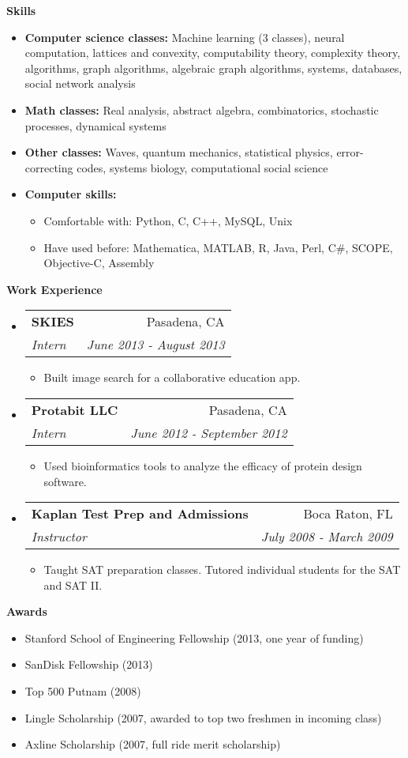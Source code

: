 \documentclass[letterpaper,11pt]{article}
\makeatletter
\newcommand{\resitem}[1]{\item #1 \vspace{-2pt}}
\newcommand{\resheading}[1]{{\large \colorbox{mygrey}{\begin{minipage}{\textwidth}{\textbf{#1 \vphantom{p\^{E}}}}\end{minipage}}}}
\newcommand{\ressubheading}[4]{
\begin{tabular*}{7.0in}{l@{\extracolsep{\fill}}r}
		\textbf{#1} & #2 \\
		\textit{#3} & \textit{#4}\\
\end{tabular*}\vspace{-6pt}}
\makeatother
\begin{document}
\resheading{Skills}
\begin{itemize}
\item \textbf{Computer science classes:} Machine learning (3 classes), neural computation, lattices and convexity, computability theory, complexity theory, algorithms, graph algorithms, algebraic graph algorithms, systems, databases, social network analysis
\item \textbf{Math classes:}  Real analysis, abstract algebra, combinatorics, stochastic processes, dynamical systems
\item \textbf{Other classes:} Waves, quantum mechanics, statistical physics, error-correcting codes, systems biology, computational social science
\item \textbf{Computer skills:}
	\begin{itemize}
	\item Comfortable with: Python, C, C++, MySQL, Unix
	\item Have used before: Mathematica, MATLAB, R, Java, Perl, C\#, SCOPE, Objective-C, Assembly
	\end{itemize}
\end{itemize}


\resheading{Work Experience}
\begin{itemize}
\item
	\ressubheading{SKIES}{Pasadena, CA}{Intern}{June 2013 - August 2013}
	\begin{itemize}
		\resitem{Built image search for a collaborative education app.}
	\end{itemize}
\item
	\ressubheading{Protabit LLC}{Pasadena, CA}{Intern}{June 2012 - September 2012}
	\begin{itemize}
		\resitem{Used bioinformatics tools to analyze the efficacy of protein design software.}
	\end{itemize}
\item
	\ressubheading{Kaplan Test Prep and Admissions}{Boca Raton, FL}{Instructor}{July 2008 - March 2009}
	\begin{itemize}
		\resitem{Taught SAT preparation classes.  Tutored individual students for the SAT and SAT II.}
	\end{itemize}
\end{itemize}

\resheading{Awards}
\begin{itemize}
	\item Stanford School of Engineering Fellowship (2013, one year of funding)
	\item SanDisk Fellowship (2013)
	\item Top 500 Putnam (2008)
	\item Lingle Scholarship (2007, awarded to top two freshmen in incoming class)
	\item Axline Scholarship (2007, full ride merit scholarship)
\end{itemize}
\end{document}
